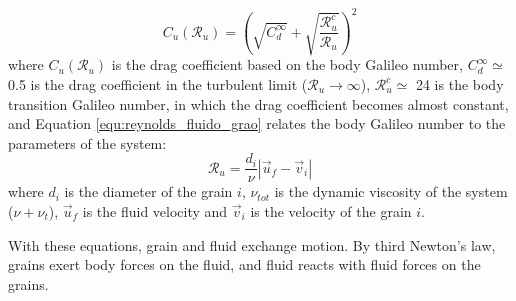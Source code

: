 \begin{equation}
    C_{u}(\mathcal{R}_{u}) = \left( \sqrt{C_{d}^{\infty}} +\sqrt{\frac{\mathcal{R}_{u}^{c}}{\mathcal{R}_{u}}} \right)^{2}
    \label{equ:reynolds_arraste}
\end{equation}
where $C_{u}(\mathcal{R}_{u})$ is the drag coefficient based on the body Galileo number, $C_{d}^{\infty} \simeq$ 0.5 is the drag coefficient in the turbulent limit ($\mathcal{R}_{u} \to \infty$), $\mathcal{R}_{u}^{c} \simeq$ 24 is the body transition Galileo number, in which the drag coefficient becomes almost constant, and Equation \ref{equ:reynolds_fluido_grao} relates the body Galileo number to the parameters of the system:
\begin{equation}
    \mathcal{R}_{u} = \frac{d_{i}}{\nu} \left| \vec{u}_{f} -\vec{v}_{i} \right|
    \label{equ:reynolds_fluido_grao}
\end{equation}
where $d_i$ is the diameter of the grain $i$, $\nu_{tot}$ is the dynamic viscosity of the system ($\nu+\nu_t$), $\vec{u}_{f}$ is the fluid velocity and $\vec{v}_i$ is the velocity of the grain $i$.

    With these equations, grain and fluid exchange motion. By third Newton's law, grains exert body forces on the fluid, and fluid reacts with fluid forces on the grains.

